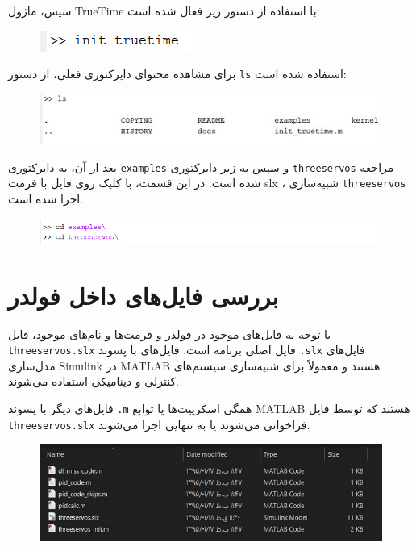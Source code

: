 سپس، ماژول TrueTime با استفاده از دستور زیر فعال شده است:

\begin{figure}[h]
	\centering
	\includegraphics{13.jpg}
	\label{fig:label4}
\end{figure}

برای مشاهده محتوای دایرکتوری فعلی، از دستور \texttt{ls} استفاده شده است:

\begin{figure}[h]
	\centering
	\includegraphics{14.jpg}
	\label{fig:label4}
\end{figure}

بعد از آن، به دایرکتوری \texttt{examples} و سپس به زیر دایرکتوری \texttt{threeservos} مراجعه شده است. در این قسمت، با کلیک روی فایل با فرمت slx ، شبیه‌سازی \texttt{threeservos} اجرا شده است.

\begin{figure}[H]
	\centering
	\includegraphics{15.jpg}
	\label{fig:label4}
\end{figure}

\newpage

\section*{بررسی فایل‌های داخل فولدر }

با توجه به فایل‌های موجود در فولدر و فرمت‌ها و نام‌های موجود، فایل \texttt{threeservos.slx} فایل اصلی برنامه است. فایل‌های با پسوند \texttt{.slx} فایل‌های مدل‌سازی Simulink در MATLAB هستند و معمولاً برای شبیه‌سازی سیستم‌های کنترلی و دینامیکی استفاده می‌شوند.

فایل‌های دیگر با پسوند \texttt{.m} همگی اسکریپت‌ها یا توابع MATLAB هستند که توسط فایل \texttt{threeservos.slx} فراخوانی می‌شوند یا به تنهایی اجرا می‌شوند.

\begin{figure}[H]
	\centering
	\includegraphics{2.jpg}
	\label{fig:label4}
\end{figure}

